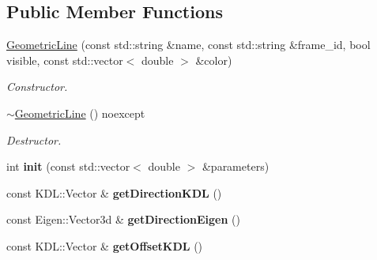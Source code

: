 \subsection*{Public Member Functions}
\begin{DoxyCompactItemize}
\item 
\hypertarget{classhiqp_1_1GeometricLine_a8bb0683049f0c15b568fc0f876ef91ea}{\hyperlink{classhiqp_1_1GeometricLine_a8bb0683049f0c15b568fc0f876ef91ea}{Geometric\-Line} (const std\-::string \&name, const std\-::string \&frame\-\_\-id, bool visible, const std\-::vector$<$ double $>$ \&color)}\label{classhiqp_1_1GeometricLine_a8bb0683049f0c15b568fc0f876ef91ea}

\begin{DoxyCompactList}\small\item\em Constructor. \end{DoxyCompactList}\item 
\hypertarget{classhiqp_1_1GeometricLine_a740dd99c1aa99454561c192a9f83ec08}{\hyperlink{classhiqp_1_1GeometricLine_a740dd99c1aa99454561c192a9f83ec08}{$\sim$\-Geometric\-Line} () noexcept}\label{classhiqp_1_1GeometricLine_a740dd99c1aa99454561c192a9f83ec08}

\begin{DoxyCompactList}\small\item\em Destructor. \end{DoxyCompactList}\item 
\hypertarget{classhiqp_1_1GeometricLine_a53add761b372aadacf7c96f7717e22f0}{int {\bfseries init} (const std\-::vector$<$ double $>$ \&parameters)}\label{classhiqp_1_1GeometricLine_a53add761b372aadacf7c96f7717e22f0}

\item 
\hypertarget{classhiqp_1_1GeometricLine_af8acab28a4e8660ebe408c7bb032ad1a}{const K\-D\-L\-::\-Vector \& {\bfseries get\-Direction\-K\-D\-L} ()}\label{classhiqp_1_1GeometricLine_af8acab28a4e8660ebe408c7bb032ad1a}

\item 
\hypertarget{classhiqp_1_1GeometricLine_adbd12ae4a30c1ea8fcd6095985271ad8}{const Eigen\-::\-Vector3d \& {\bfseries get\-Direction\-Eigen} ()}\label{classhiqp_1_1GeometricLine_adbd12ae4a30c1ea8fcd6095985271ad8}

\item 
\hypertarget{classhiqp_1_1GeometricLine_acad388b9595540ccbb2d074ee07211eb}{const K\-D\-L\-::\-Vector \& {\bfseries get\-Offset\-K\-D\-L} ()}\label{classhiqp_1_1GeometricLine_acad388b9595540ccbb2d074ee07211eb}


\end{DoxyCompactItemize}
